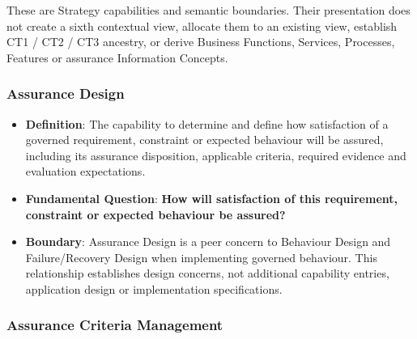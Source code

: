 \label{rad:enabling:678}

These are Strategy capabilities and semantic boundaries. Their presentation does not create a sixth contextual view, allocate them to an existing view, establish CT1 /\allowbreak{} CT2 /\allowbreak{} CT3 ancestry, or derive Business Functions, Services, Processes, Features or assurance Information Concepts.

\label{rad:enabling:680}
\subsubsection*{Assurance Design}
\label{rad:enabling:682}

\begin{itemize}

\item 
\textbf{Definition}: The capability to determine and define how satisfaction of a governed requirement, constraint or expected behaviour will be assured, including its assurance disposition, applicable criteria, required evidence and evaluation expectations.



\item 
\textbf{Fundamental Question}: \textbf{How will satisfaction of this requirement, constraint or expected behaviour be assured?}



\item 
\textbf{Boundary}: Assurance Design is a peer concern to Behaviour Design and Failure/\allowbreak{}Recovery Design when implementing governed behaviour. This relationship establishes design concerns, not additional capability entries, application design or implementation specifications.



\end{itemize}
\label{rad:enabling:686}
\subsubsection*{Assurance Criteria Management}
\label{rad:enabling:688}

